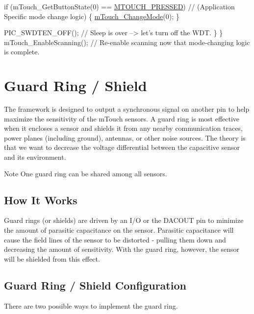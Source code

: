 \begin{DoxyCode}
        \textcolor{keywordflow}{if} (mTouch\_GetButtonState(0) == \hyperlink{m_touch_cap_2_p_i_c12_f_01_p_i_c16_f_01_library_2m_touch_8h_a7d72b112c35bc51408030eb7ecdcacd2aed5b3f2b7065991010f45eb04759ef01}{MTOUCH\_PRESSED})   \textcolor{comment}{// (Application Specific mode
       change logic)}
        \{
            \hyperlink{m_touch_cap_2_p_i_c12_f_01_p_i_c16_f_01_library_2m_touch_8h_ad4b3c623e779e2b0cbe5a8ace84c1561}{mTouch\_ChangeMode}(0);
        \}
        
        PIC\_SWDTEN\_OFF();                 \textcolor{comment}{// Sleep is over --> let's turn off the WDT.}
    \}
\}
mTouch\_EnableScanning();    \textcolor{comment}{// Re-enable scanning now that mode-changing logic is complete.}
\end{DoxyCode}
 \hypertarget{featGuard}{}\section{Guard Ring / Shield}\label{featGuard}
The framework is designed to output a synchronous signal on another pin to help maximize the sensitivity of the m\+Touch sensors. A guard ring is most effective when it encloses a sensor and shields it from any nearby communication traces, power planes (including ground), antennas, or other noise sources. The theory is that we want to decrease the voltage differential between the capacitive sensor and its environment.

\begin{DoxyNote}{Note}
One guard ring can be shared among all sensors.
\end{DoxyNote}
\hypertarget{feat_guard_featGuard-How}{}\subsection{How It Works}\label{feat_guard_featGuard-How}
Guard rings (or shields) are driven by an I/\+O or the D\+A\+C\+O\+U\+T pin to minimize the amount of parasitic capacitance on the sensor. Parasitic capacitance will cause the field lines of the sensor to be distorted -\/ pulling them down and decreasing the amount of sensitivity. With the guard ring, however, the sensor will be shielded from this effect.

 \hypertarget{feat_guard_featGuard-Config}{}\subsection{Guard Ring / Shield Configuration}\label{feat_guard_featGuard-Config}
There are two possible ways to implement the guard ring.


